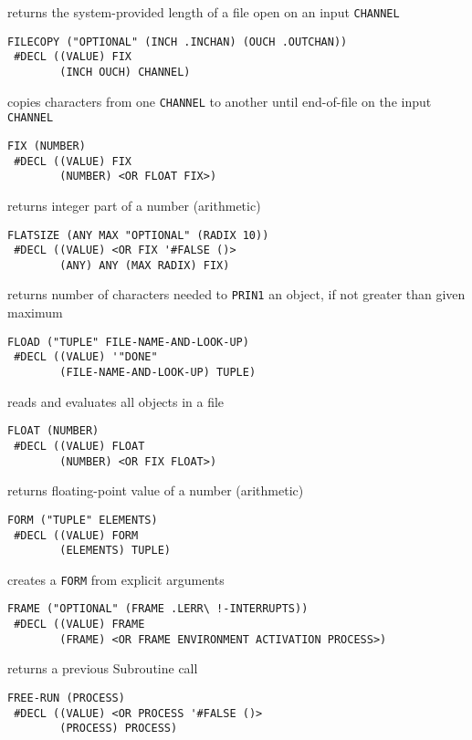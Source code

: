 \documentclass[a4paper]{scrbook}
\begin{document}
returns the system-provided length of a file open on an input \texttt{CHANNEL}

\begin{verbatim}
FILECOPY ("OPTIONAL" (INCH .INCHAN) (OUCH .OUTCHAN))
 #DECL ((VALUE) FIX
        (INCH OUCH) CHANNEL)
\end{verbatim}

copies characters from one \texttt{CHANNEL} to another until end-of-file on the input \texttt{CHANNEL}

\begin{verbatim}
FIX (NUMBER)
 #DECL ((VALUE) FIX
        (NUMBER) <OR FLOAT FIX>)
\end{verbatim}

returns integer part of a number (arithmetic)

\begin{verbatim}
FLATSIZE (ANY MAX "OPTIONAL" (RADIX 10))
 #DECL ((VALUE) <OR FIX '#FALSE ()>
        (ANY) ANY (MAX RADIX) FIX)
\end{verbatim}

returns number of characters needed to \texttt{PRIN1} an object, if not greater than given maximum

\begin{verbatim}
FLOAD ("TUPLE" FILE-NAME-AND-LOOK-UP)
 #DECL ((VALUE) '"DONE"
        (FILE-NAME-AND-LOOK-UP) TUPLE)
\end{verbatim}

reads and evaluates all objects in a file

\begin{verbatim}
FLOAT (NUMBER)
 #DECL ((VALUE) FLOAT
        (NUMBER) <OR FIX FLOAT>)
\end{verbatim}

returns floating-point value of a number (arithmetic)

\begin{verbatim}
FORM ("TUPLE" ELEMENTS)
 #DECL ((VALUE) FORM
        (ELEMENTS) TUPLE)
\end{verbatim}

creates a \texttt{FORM} from explicit arguments

\begin{verbatim}
FRAME ("OPTIONAL" (FRAME .LERR\ !-INTERRUPTS))
 #DECL ((VALUE) FRAME
        (FRAME) <OR FRAME ENVIRONMENT ACTIVATION PROCESS>)
\end{verbatim}

returns a previous Subroutine call

\begin{verbatim}
FREE-RUN (PROCESS)
 #DECL ((VALUE) <OR PROCESS '#FALSE ()>
        (PROCESS) PROCESS)
\end{verbatim}
\end{document}
